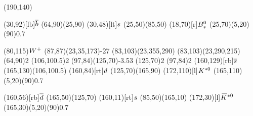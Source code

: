 \documentclass{standalone}
\begin{document}
\begin{axopicture}(190,140)

  \Text(30,92)[lb]{${\overline {{b}}}$}                           %
  \Line[arrow](64,90)(25,90)                               %
  \Text(30,48)[lt]{${s}$}                              %
  \Line[arrow](25,50)(85,50)                               %
  \Text(18,70)[r]{${{B}^0_{s}}$}                                   %
  \GOval(25,70)(5,20)(90){0.7}                             %
                                                           
  \Text(80,115){\small{${W^+}$}}                             %
  \PhotonArc(87,87)(23,35,173){-2}{7}                      %
  \Arc[arrow,clockwise,arrowpos=0.4](83,103)(23,355,290)   %
  \Arc[arrow,clockwise,arrowpos=0.4](83,103)(23,290,215)   %
  \Vertex(64,90){2}                                        %
  \Vertex(106,100.5){2}                                    %
  \Gluon(97,84)(125,70){-3.5}{3}                           %
  \Vertex(125,70){2}                                       %
  \Vertex(97,84){2}                                        %
  \Text(160,129)[rb]{${\overline {{s}}}$}                         %
  \Line[arrow](165,130)(106,100.5)                         %
  \Text(160,84)[rt]{${d}$}                             %
  \Line[arrow](125,70)(165,90)                             %
  \Text(172,110)[l]{${{K}^{*0}}$}                             %
  \GOval(165,110)(5,20)(90){0.7}                           %
                                                           
  \Text(160,56)[rb]{${\overline {{d}}}$}                          %
  \Line[arrow](165,50)(125,70)                             %
  \Text(160,11)[rt]{${s}$}                             %
  \Line[arrow](85,50)(165,10)                              %
  \Text(172,30)[l]{${{\kern 0.18em\overline{\kern -0.18em K}}{}^{*0}}$}                             %
  \GOval(165,30)(5,20)(90){0.7}                            %
                                                           
\end{axopicture}
\end{document}
